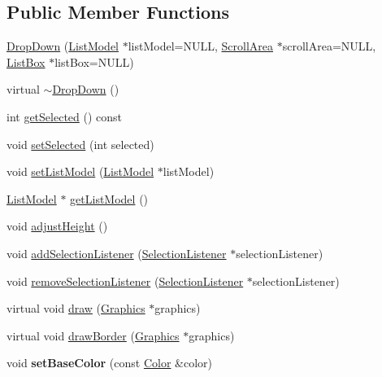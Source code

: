 \subsection*{Public Member Functions}
\begin{DoxyCompactItemize}
\item 
\hyperlink{classgcn_1_1DropDown_a8cc1eaa43f21818e6a80606ce5543099}{Drop\+Down} (\hyperlink{classgcn_1_1ListModel}{List\+Model} $\ast$list\+Model=N\+U\+LL, \hyperlink{classgcn_1_1ScrollArea}{Scroll\+Area} $\ast$scroll\+Area=N\+U\+LL, \hyperlink{classgcn_1_1ListBox}{List\+Box} $\ast$list\+Box=N\+U\+LL)
\item 
virtual \hyperlink{classgcn_1_1DropDown_afd2801677bd40fabb3dba5e28758fdf0}{$\sim$\+Drop\+Down} ()
\item 
int \hyperlink{classgcn_1_1DropDown_aeefe59776b354441faa9cc396723e905}{get\+Selected} () const 
\item 
void \hyperlink{classgcn_1_1DropDown_a01042c330073ed25d7ec4629647bdf79}{set\+Selected} (int selected)
\item 
void \hyperlink{classgcn_1_1DropDown_adc12528be39ab01791c71969a00e37c2}{set\+List\+Model} (\hyperlink{classgcn_1_1ListModel}{List\+Model} $\ast$list\+Model)
\item 
\hyperlink{classgcn_1_1ListModel}{List\+Model} $\ast$ \hyperlink{classgcn_1_1DropDown_a3c2ab20b50c9421accb76b557e558054}{get\+List\+Model} ()
\item 
void \hyperlink{classgcn_1_1DropDown_a39f06966d6236c7ead1a32c121dabcf9}{adjust\+Height} ()
\item 
void \hyperlink{classgcn_1_1DropDown_a82a8e42e1a902e32e7d2917665039073}{add\+Selection\+Listener} (\hyperlink{classgcn_1_1SelectionListener}{Selection\+Listener} $\ast$selection\+Listener)
\item 
void \hyperlink{classgcn_1_1DropDown_a44a2e345d02a70417398cbe52b6d3495}{remove\+Selection\+Listener} (\hyperlink{classgcn_1_1SelectionListener}{Selection\+Listener} $\ast$selection\+Listener)
\item 
virtual void \hyperlink{classgcn_1_1DropDown_acf081df400b8dd2affac734122bfdc8c}{draw} (\hyperlink{classgcn_1_1Graphics}{Graphics} $\ast$graphics)
\item 
virtual void \hyperlink{classgcn_1_1DropDown_a0fd541dd030eab962d27c1488f0d0aac}{draw\+Border} (\hyperlink{classgcn_1_1Graphics}{Graphics} $\ast$graphics)
\item 
void {\bfseries set\+Base\+Color} (const \hyperlink{classgcn_1_1Color}{Color} \&color)\hypertarget{classgcn_1_1DropDown_a2544d55f5bae9b499b2d29c8d0cf0ca6}{}\label{classgcn_1_1DropDown_a2544d55f5bae9b499b2d29c8d0cf0ca6}


\end{DoxyCompactItemize}

